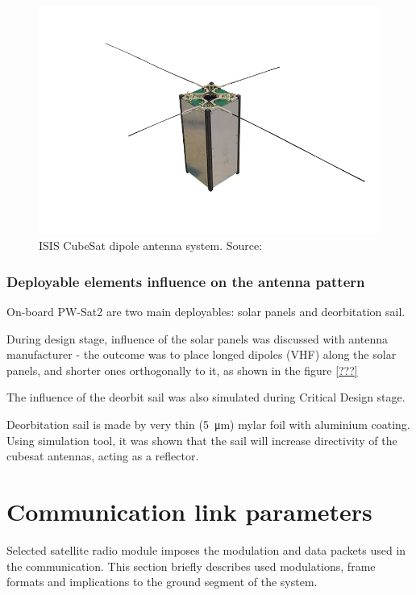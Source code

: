     \begin{figure}[H]
        \centering
        \includegraphics[width=0.8\paperwidth]{img/2/CubeSat-antenna-dipole-configuration.png}
        \caption{ISIS CubeSat dipole antenna system. Source: \cite{???}}
        \label{ISIS_antenna}
    \end{figure}


\subsubsection{Deployable elements influence on the antenna pattern}

On-board PW-Sat2 are two main deployables: solar panels and deorbitation sail.

During design stage, influence of the solar panels was discussed with antenna manufacturer - the outcome was to place longed dipoles (VHF) along the solar panels, and shorter ones orthogonally to it, as shown in the figure \ref{???}


The influence of the deorbit sail was also simulated during Critical Design stage.

Deorbitation sail is made by very thin (\SI{5}{\micro\meter}) mylar foil with aluminium coating. Using %
simulation tool, it was shown that the sail will increase directivity of the cubesat antennas, acting as a reflector.


\section{Communication link parameters}
Selected satellite radio module imposes the modulation and data packets used in the communication. This section briefly describes used modulations, frame formats and implications to the ground segment of the system.

